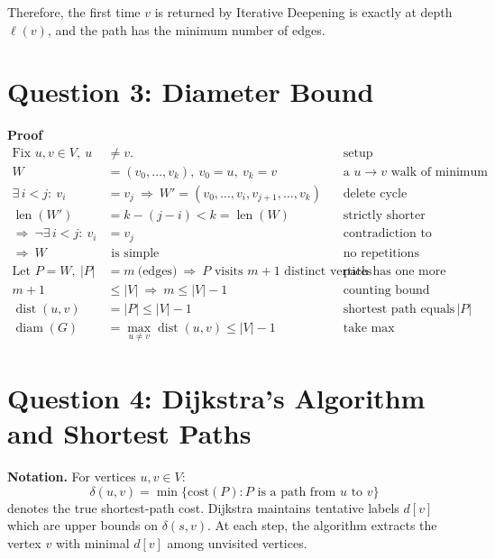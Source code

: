 \documentclass[11pt]{article}
\theoremstyle{definition}
\theoremstyle{remark}
\begin{document}
Therefore, the first time $v$ is returned by Iterative Deepening is exactly at depth $\ell(v)$, and the path has the minimum number of edges.


\section*{Question 3: Diameter Bound}

\noindent\textbf{Proof}\\
\begin{align*}
\text{Fix }u,v\in V,\ u&\neq v. &\text{setup}\\
W &= (v_0,\ldots,v_k),\ v_0=u,\ v_k=v &\text{a $u\!\to\! v$ walk of minimum length}\\
\exists\, i<j:\ v_i&=v_j \ \Rightarrow\ W'=(v_0,\ldots,v_i,v_{j+1},\ldots,v_k) &\text{delete cycle}\\
\operatorname{len}(W')&=k-(j-i) < k=\operatorname{len}(W) &\text{strictly shorter}\\
\Rightarrow\ \neg\exists\, i<j:\ v_i&=v_j &\text{contradiction to minimality}\\
\Rightarrow\ W&\text{ is simple} &\text{no repetitions}\\[3pt]
\text{Let }P=W,\ |P|&=m\ \text{(edges)} \ \Rightarrow\ \text{$P$ visits }m+1\text{ distinct vertices} &\text{path has one more vertex}\\
m+1 &\le |V| \ \Rightarrow\ m\le |V|-1 &\text{counting bound}\\
\operatorname{dist}(u,v) &= |P| \le |V|-1 &\text{shortest path equals $|P|$}\\
\operatorname{diam}(G) &= \max_{u\neq v}\operatorname{dist}(u,v) \le |V|-1 &\text{take max}
\end{align*}



\section*{Question 4: Dijkstra’s Algorithm and Shortest Paths}

\noindent\textbf{Notation.}  
For vertices $u,v \in V$:  
\[
\delta(u,v) = \min \{\text{cost}(P) : P \text{ is a path from }u\text{ to }v\}
\]
denotes the true shortest-path cost.  
Dijkstra maintains tentative labels $d[v]$ which are upper bounds on $\delta(s,v)$.  
At each step, the algorithm extracts the vertex $v$ with minimal $d[v]$ among unvisited vertices.
\end{document}

